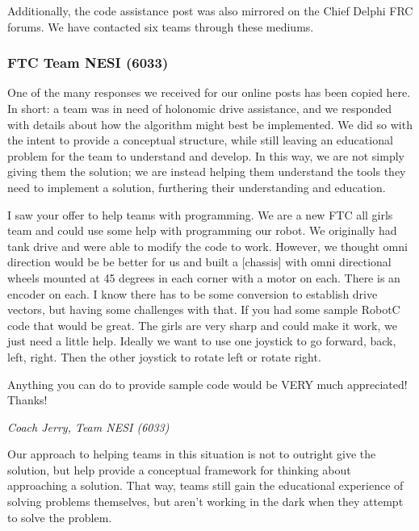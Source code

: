 



Additionally, the code assistance post was also mirrored on the Chief Delphi FRC forums. We have contacted six teams through these mediums. 

\subsubsection{FTC Team NESI (6033)}

One of the many responses we received for our online posts has been copied here. In short: a team was in need of holonomic drive assistance, and we responded with details about how the algorithm might best be implemented. We did so with the intent to provide a conceptual structure, while still leaving an educational problem for the team to understand and develop. In this way, we are not simply giving them the solution; we are instead helping them understand the tools they need to implement a solution, furthering their understanding and education.

\begin{fancyquotes}
I saw your offer to help teams with programming. We are a new FTC all girls team and could use some help with programming our robot. We originally had tank drive and were able to modify the code to work. However, we thought omni direction would be be better for us and built a [chassis] with omni directional wheels mounted at 45 degrees in each corner with a motor on each. There is an encoder on each. I know there has to be some conversion to establish drive vectors, but having some challenges with that. If you had some sample RobotC code that would be great. The girls are very sharp and could make it work, we just need a little help. Ideally we want to use one joystick to go forward, back, left, right. Then the other joystick to rotate left or rotate right.
 
Anything you can do to provide sample code would be VERY much appreciated! Thanks!

\textit{Coach Jerry, Team NESI (6033)}
\end{fancyquotes}

Our approach to helping teams in this situation is not to outright give the solution, but help provide a conceptual framework for thinking about approaching a solution. That way, teams still gain the educational experience of solving problems themselves, but aren't working in the dark when they attempt to solve the problem.

